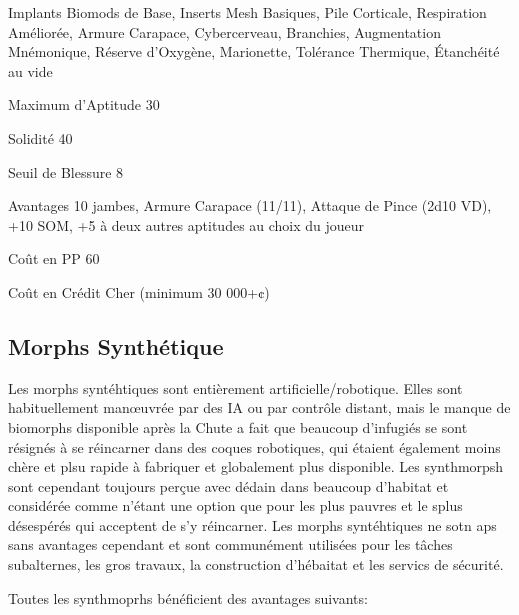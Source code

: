\begin{description*} \item[Implants] Biomods de Base, Inserts Mesh Basiques, Pile Corticale, Respiration Améliorée, Armure Carapace, Cybercerveau, Branchies, Augmentation Mnémonique, Réserve d'Oxygène, Marionette, Tolérance Thermique, Étanchéité au vide \item[Maximum d'Aptitude] 30 \item[Solidité] 40 \item[Seuil de Blessure] 8 \item[Avantages] 10 jambes, Armure Carapace (11/11), Attaque de Pince (2d10 VD), +10 SOM, +5 à deux autres aptitudes au choix du joueur\item[Coût en PP] 60 \item[Coût en Crédit] Cher (minimum 30 000+¢) \end{description*} 

\subsection{Morphs Synthétique} \label{sec:starting-syntheticmorphs} 

Les morphs syntéhtiques sont entièrement artificielle/robotique. Elles sont habituellement manœuvrée par des IA ou par contrôle distant, mais le manque de biomorphs disponible après la Chute a fait que beaucoup d'infugiés se sont résignés à se réincarner dans des coques robotiques, qui étaient également moins chère et plsu rapide à fabriquer et globalement plus disponible. Les synthmorpsh sont cependant toujours perçue avec dédain dans beaucoup d'habitat et considérée comme n'étant une option que pour les plus pauvres et le splus désespérés qui acceptent de s'y réincarner. Les morphs syntéhtiques ne sotn aps sans avantages cependant et sont communément utilisées pour les tâches subalternes, les gros travaux, la construction d'hébaitat et les servics de sécurité. 

Toutes les synthmoprhs bénéficient des avantages suivants: 

